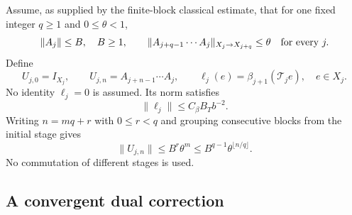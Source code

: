 Assume, as supplied by the finite-block classical estimate,
that for one fixed integer $q\ge1$ and $0\le\theta<1$,
\begin{equation}
 \|A_j\|\le B,\quad B\ge1,\qquad
 \|A_{j+q-1}\cdots A_j\|_{X_j\to X_{j+q}}\le\theta
                         \quad\hbox{for every }j.
 \label{acc-block-input}
\end{equation}
Define
\begin{equation}
 U_{j,0}=I_{X_j},\qquad
 U_{j,n}=A_{j+n-1}\cdots A_j,\qquad
 \ell_j(e)=\beta_{j+1}(\mathcal T_je),\quad e\in X_j.
 \label{acc-evolution-leakage}
\end{equation}
No identity $\ell_j=0$ is assumed. Its norm satisfies
\begin{equation}
                         \|\ell_j\|\le C_\beta B_Tb^{-2}.
 \label{acc-leakage-bound}
\end{equation}
Writing $n=mq+r$ with $0\le r<q$ and grouping consecutive
blocks from the initial stage gives
\begin{equation}
            \|U_{j,n}\|\le B^r\theta^m
                         \le B^{q-1}\theta^{\lfloor n/q\rfloor}.
 \label{acc-evolution-decay}
\end{equation}
No commutation of different stages is used.

\subsection{A convergent dual correction}
\label{acc-dual-section}

